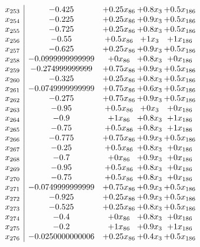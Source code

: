 \documentclass[11pt]{article}
\begin{document}
\[\begin{array}{c| c c@{\hskip 2pt} c@{\hskip 2pt} c@{\hskip 2pt} }
 x_{253}   &  -0.425 & + 0.25 x_{86} & + 0.8 x_{3} & + 0.5 x_{186}\\
 x_{254}   &  -0.225 & + 0.25 x_{86} & + 0.9 x_{3} & + 0.5 x_{186}\\
 x_{255}   &  -0.725 & + 0.25 x_{86} & + 0.8 x_{3} & + 0.5 x_{186}\\
 x_{256}   &  -0.55 & + 0.5 x_{86} & + 1 x_{3} & + 1 x_{186}\\
 x_{257}   &  -0.625 & + 0.25 x_{86} & + 0.9 x_{3} & + 0.5 x_{186}\\
 x_{258}   &  -0.0999999999999 & + 0 x_{86} & + 0.8 x_{3} & + 0 x_{186}\\
 x_{259}   &  -0.274999999999 & + 0.75 x_{86} & + 0.9 x_{3} & + 0.5 x_{186}\\
 x_{260}   &  -0.325 & + 0.25 x_{86} & + 0.8 x_{3} & + 0.5 x_{186}\\
 x_{261}   &  -0.0749999999999 & + 0.75 x_{86} & + 0.6 x_{3} & + 0.5 x_{186}\\
 x_{262}   &  -0.275 & + 0.75 x_{86} & + 0.9 x_{3} & + 0.5 x_{186}\\
 x_{263}   &  -0.95 & + 0.5 x_{86} & + 0 x_{3} & + 0 x_{186}\\
 x_{264}   &  -0.9 & + 1 x_{86} & + 0.8 x_{3} & + 1 x_{186}\\
 x_{265}   &  -0.75 & + 0.5 x_{86} & + 0.8 x_{3} & + 1 x_{186}\\
 x_{266}   &  -0.775 & + 0.75 x_{86} & + 0.9 x_{3} & + 0.5 x_{186}\\
 x_{267}   &  -0.25 & + 0.5 x_{86} & + 0.8 x_{3} & + 0 x_{186}\\
 x_{268}   &  -0.7 & + 0 x_{86} & + 0.9 x_{3} & + 0 x_{186}\\
 x_{269}   &  -0.95 & + 0.5 x_{86} & + 0.8 x_{3} & + 0 x_{186}\\
 x_{270}   &  -0.75 & + 0.5 x_{86} & + 0.8 x_{3} & + 0 x_{186}\\
 x_{271}   &  -0.0749999999999 & + 0.75 x_{86} & + 0.9 x_{3} & + 0.5 x_{186}\\
 x_{272}   &  -0.925 & + 0.25 x_{86} & + 0.9 x_{3} & + 0.5 x_{186}\\
 x_{273}   &  -0.525 & + 0.25 x_{86} & + 0.8 x_{3} & + 0.5 x_{186}\\
 x_{274}   &  -0.4 & + 0 x_{86} & + 0.8 x_{3} & + 0 x_{186}\\
 x_{275}   &  -0.2 & + 1 x_{86} & + 0.9 x_{3} & + 1 x_{186}\\
 x_{276}   &  -0.0250000000006 & + 0.25 x_{86} & + 0.4 x_{3} & + 0.5 x_{186}\\

\end{array}\]
\end{document}
